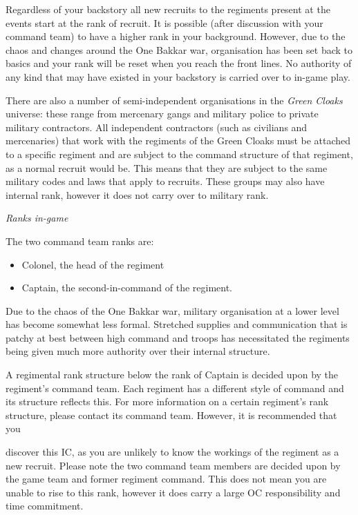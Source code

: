 \documentclass{scrbook}
\begin{document}
Regardless of your backstory all new recruits to the regiments present at the events start at the rank of recruit. It is possible (after discussion with your command team) to have a higher rank in your background. However, due to the chaos and changes around the One Bakkar war, organisation has been set back to basics and your rank will be reset when you reach the front lines. No authority of any kind that may have existed in your backstory is carried over to in-game play.

There are also a number of semi-independent organisations in the \textit{Green Cloaks} universe: these range from mercenary gangs and military police to private military contractors. All independent contractors (such as civilians and mercenaries) that work with the regiments of the Green Cloaks must be attached to a specific regiment and are subject to the command structure of that regiment, as a normal recruit would be. This means that they are subject to the same military codes and laws that apply to recruits. These groups may also have internal rank, however it does not carry over to military rank.

\textit{Ranks in-game}

The two command team ranks are:

\begin{itemize}
\item Colonel, the head of the regiment

\item Captain, the second-in-command of the regiment.

\end{itemize}
Due to the chaos of the One Bakkar war, military organisation at a lower level has become somewhat less formal. Stretched supplies and communication that is patchy at best between high command and troops has necessitated the regiments being given much more authority over their internal structure.

A regimental rank structure below the rank of Captain is decided upon by the regiment's command team. Each regiment has a different style of command and its structure reflects this. For more information on a certain regiment's rank structure, please contact its command team. However, it is recommended that you

discover this IC, as you are unlikely to know the workings of the regiment as a new recruit. Please note the two command team members are decided upon by the game team and former regiment command. This does not mean you are unable to rise to this rank, however it does carry a large OC responsibility and time commitment.
\end{document}
